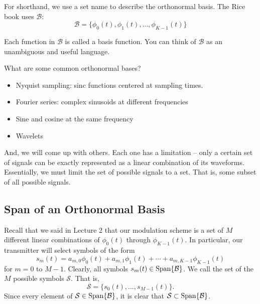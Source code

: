 For shorthand, we use a set name to describe the orthonormal basis.  The Rice book uses $\mathcal{B}$:
\[
 \mathcal{B} = \{ \phi_0(t), \phi_1(t), \ldots, \phi_{K-1}(t) \}
\]

Each function in $\mathcal{B}$ is called a basis function. You can
think of $\mathcal{B}$ as an unambiguous and useful language.  

What are some common orthonormal bases?
\begin{itemize}
 \item Nyquist sampling: sinc functions centered at sampling times.
 \item Fourier series: complex sinusoids at different frequencies
 \item Sine and cosine at the same frequency
 \item Wavelets
\end{itemize}
And, we will come up with others.  Each one has a limitation -- only a certain set of signals can be exactly represented as a linear combination of its waveforms.  Essentially, we must limit the set of possible signals to a set.  That is, some subset of all possible signals.


\subsection{Span of an Orthonormal Basis}


Recall that we said in Lecture 2 that our modulation scheme is a set of $M$ different linear combinations of $\phi_0(t)$ through $\phi_{K-1}(t)$.  In particular, our transmitter will select symbols of the form
\[
 s_m(t) = a_{m,0} \phi_0(t) + a_{m,1} \phi_1(t) + \cdots + a_{m,K-1} \phi_{K-1}(t) 
\]
for $m=0$ to $M-1$.  Clearly, all symbols $s_m(t) \in \mbox{Span} \{ \mathcal{B} \}$.  We call the set of the $M$ possible symbols $\mathcal{S}$.  That is,
\[
 \mathcal{S} = \{ s_0(t), \ldots, s_{M-1}(t)\}.
\]
Since every element of $ \mathcal{S} \in \mbox{Span} \{ \mathcal{B} \}$, it is clear that $ \mathcal{S} \subset \mbox{Span} \{ \mathcal{B} \}$.



